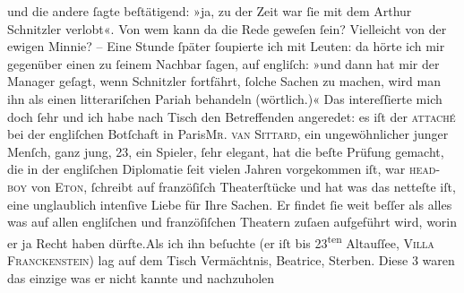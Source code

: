 \begin{ledgroupsized}[t]{13cm}
               und die andere ſagte beſtätigend: »ja, zu der Zeit war ſie mit {\pb}dem Arthur Schnitzler verlobt«.
               Von wem kann da die Rede geweſen ſein? Vielleicht von der ewigen Minnie?\pend
           \pstart
           \numberlinefalse{}\centering{}–\numberlinetrue{}\pend
           \pstart
           \noindent{}Eine Stunde ſpäter ſoupierte ich mit Leuten: da hörte ich mir gegenüber einen  zu ſeinem Nachbar ſagen, auf engliſch: »und dann
               hat mir der Manager geſagt, wenn Schnitzler fortfährt, {\pb}ſolche Sachen zu machen, wird man
               ihn als einen litterariſchen Pariah behandeln (wörtlich.)« Das intereſſierte mich
               doch ſehr und ich habe nach Tisch den Betreffenden angeredet: es iſt der \textsc{attaché} bei der engliſchen
                  Botſchaft in Paris\textsc{Mr. van Sittard}, ein ungewöhnlicher junger Menſch, ganz jung, 23, ein Spieler, ſehr elegant,
               hat die beſte Prüfung gemacht, die in {\pb}der engliſchen Diplomatie ſeit
               vielen Jahren vorgekommen iſt, war \textsc{head-boy} von \textsc{Eton}, ſchreibt auf franzöſiſch Theaterſtücke und hat was das netteſte iſt, eine
               unglaublich intenſive Liebe für Ihre Sachen. Er findet ſie weit beſſer als alles was
               auf allen engliſchen und franzöſiſchen Theatern zuſa{\geminationm}en
               aufgeführt wird, worin er ja Recht haben dürfte.\hspace*{1.5em}Als
               ich ihn beſuchte (er {\pb}iſt bis
                     23\textsuperscript{ten}{ }Altauſſee, \textsc{Villa
                     Franckenſtein}) lag auf dem Tisch Vermächtnis, Beatrice, Sterben. Diese 3 waren das einzige was er nicht kannte und nachzuholen

\end{ledgroupsized}
